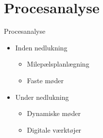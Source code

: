 \section{Procesanalyse}
\begin{frame}{Procesanalyse}
\begin{itemize}
\item Inden nedlukning
\begin{itemize}
\item Milepælsplanlægning
\item Faste møder
\end{itemize}
\item Under nedlukning
\begin{itemize}
\item Dynamiske møder
\item Digitale værktøjer
\end{itemize}
\end{itemize}
\end{frame}
